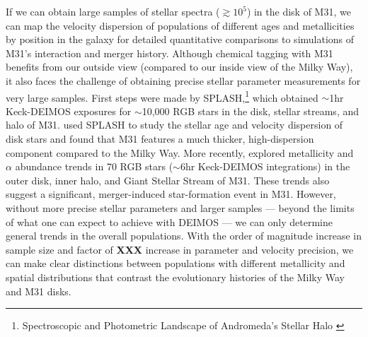 \documentclass[11pt,a4paper,twoside,onecolumn,openany,final,oldfontcommands]{memoir}
\begin{document}
If we can obtain large samples of stellar spectra ($\gtrsim 10^5$) in the disk of M31, we can map the velocity dispersion of populations of different ages and metallicities by position in the galaxy for detailed quantitative comparisons to simulations of M31's interaction and merger history. Although chemical tagging with M31 benefits from our outside view (compared to our inside view of the Milky Way), it also faces the challenge of obtaining precise stellar parameter measurements for very large samples.  First steps were made by SPLASH,\footnote{Spectroscopic and Photometric Landscape of Andromeda’s Stellar Halo \citep[e.g.][]{splash}} which obtained $\sim$1hr Keck-DEIMOS exposures for $\sim$10,000 RGB stars in the disk, stellar streams, and halo of M31.  \citet{dorman15} used SPLASH to study the stellar age and velocity dispersion of disk stars and found that M31 features a much thicker, high-dispersion component compared to the Milky Way.  More recently, \citet{escala20} explored metallicity and $\alpha$ abundance trends in 70 RGB stars ($\sim$6hr Keck-DEIMOS integrations) in the outer disk, inner halo, and Giant Stellar Stream of M31.  These trends also suggest a significant, merger-induced star-formation event in M31.  However, without more precise stellar parameters and larger samples --- beyond the limits of what one can expect to achieve with DEIMOS --- we can only determine general trends in the overall populations.  With the order of magnitude increase in sample size and factor of {\bf XXX} increase in parameter and velocity precision, we can make clear distinctions between populations with different metallicity and spatial distributions that contrast the evolutionary histories of the Milky Way and M31 disks.
\end{document}
